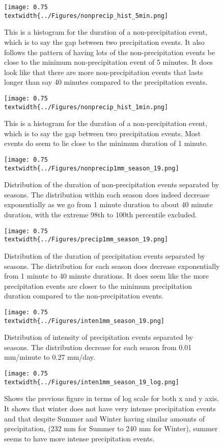 \begin{figure}[h]
\centering \texttt{[image: 0.75\\textwidth\{../Figures/nonprecip\_hist\_5min.png]} 
\caption{\label{abcg}This is a histogram for the duration of a
non-precipitation event, which is to say the gap between two
precipitation events. It also follows the pattern of having lots of
the non-precipitation events be close to the minimum non-precipitation
event of 5 minutes. It does look like that there are more
non-precipitation events that lasts longer than say 40 minutes
compared to the precipitation events. }
\end{figure}
\begin{figure}[h]
\centering
\texttt{[image: 0.75\\textwidth\{../Figures/nonprecip\_hist\_1min.png]}
\caption{\label{abch}This is a histogram for the duration of a non-precipitation
event, which is to say the gap between two precipitation events. Most
events do seem to lie close to the minimum duration of 1 minute.} 
\end{figure}
\begin{figure}[h]
\centering 
\texttt{[image: 0.75\\textwidth\{../Figures/nonprecip1mm\_season\_19.png]} 
\caption{\label{abci}Distribution of the duration of non-precipitation
events separated by seasons. The distribution within each season does
indeed decrease exponentially as we go from 1 minute duration to about
40 minute duration, with the extreme 98th to 100th percentile
excluded.}
\end{figure}
\begin{figure}[h]
\centering
\texttt{[image: 0.75\\textwidth\{../Figures/precip1mm\_season\_19.png]}
\caption{\label{abcj}Distribution of the duration of precipitation events
separated by seasons. The distribution for each season does decrease
exponentially from 1 minute to 40 minute durations. It does seem like
the more precipitation events are closer to the minimum precipitation
duration compared to the non-precipitation events.} 
\end{figure}
\begin{figure}[h]
\centering \texttt{[image: 0.75\\textwidth\{../Figures/inten1mm\_season\_19.png]} 
\caption{\label{abck}Distribution of intensity of precipitation events
separated by seasons. The distribution decrease for each season from
0.01 mm/minute to 0.27 mm/day.}
\end{figure}
\begin{figure}[h]
\centering
\texttt{[image: 0.75\\textwidth\{../Figures/inten1mm\_season\_19\_log.png]}
\caption{\label{abcl}Shows the previous figure in terms of log scale for both x
and y axis. It shows that winter does not have very intense
precipitation events and that despite Summer and Winter having similar
amounts of precipitation, (232 mm for Summer to 240 mm for Winter),
summer seems to have more intense precipitation events.}
\end{figure}
%
